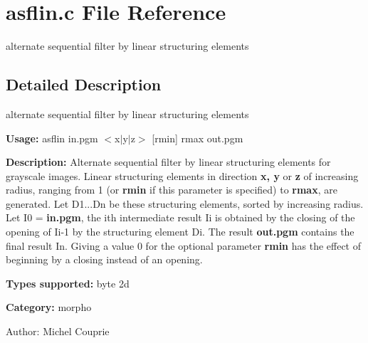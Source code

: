 \section{asflin.c File Reference}
\label{asflin_8c}
alternate sequential filter by linear structuring elements 



\subsection{Detailed Description}
alternate sequential filter by linear structuring elements 

{\bf Usage:} asflin in.pgm $<$x$|$y$|$z$>$ [rmin] rmax out.pgm

{\bf Description:} Alternate sequential filter by linear structuring elements for grayscale images. Linear structuring elements in direction {\bf x, y} or {\bf z} of increasing radius, ranging from 1 (or {\bf rmin} if this parameter is specified) to {\bf rmax}, are generated. Let D1...Dn be these structuring elements, sorted by increasing radius. Let I0 = {\bf in.pgm}, the ith intermediate result Ii is obtained by the closing of the opening of Ii-1 by the structuring element Di. The result {\bf out.pgm} contains the final result In. Giving a value 0 for the optional parameter {\bf rmin} has the effect of beginning by a closing instead of an opening.

{\bf Types supported:} byte 2d

{\bf Category:} morpho

\begin{Desc}
\item[Author:]Michel Couprie \end{Desc}
